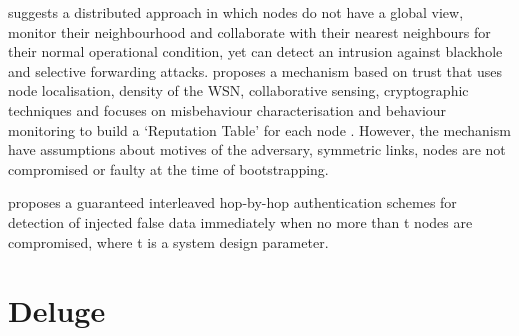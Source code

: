 \documentclass[conference,final]{IEEEtran}
\begin{document}
\cite{ioannis2007towards} suggests a distributed approach in which nodes do not have a global view, monitor their neighbourhood and collaborate with their nearest neighbours for their normal operational condition, yet can detect an intrusion against blackhole and selective forwarding attacks.
\cite{sen2010efficient} proposes a mechanism based on trust that uses node localisation, density of the WSN, collaborative sensing, cryptographic techniques  and focuses on misbehaviour characterisation and behaviour monitoring to build a `Reputation Table' for each node . However, the mechanism have assumptions about motives of the adversary, symmetric links, nodes  are not compromised or faulty at the time of bootstrapping. 

\cite{Zhu:2007:IHA:1267060.1267062} proposes a guaranteed interleaved hop-by-hop authentication schemes for detection of injected false data immediately when no more than t nodes are compromised, where t is a system design parameter. 




\section{Deluge} %
\label{sec:del}

\end{document}
